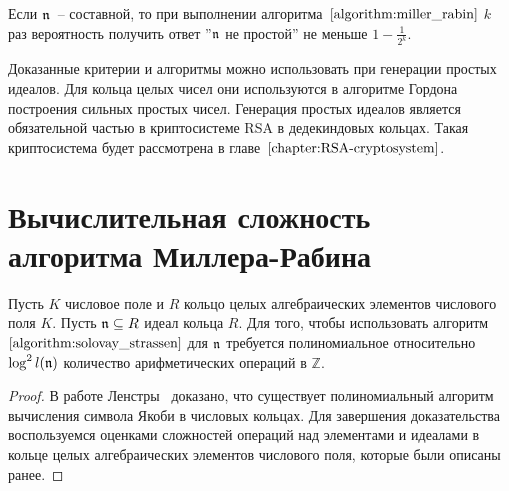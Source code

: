 \documentclass[_00_dissertation.tex]{subfiles}
\begin{document}
\begin{remark}
    Если $\mathfrak{n}$~-- составной, то при выполнении алгоритма~$\ref{algorithm:miller_rabin}$ $k$ раз вероятность получить ответ ''$\mathfrak{n}$ не простой'' не меньше $1 - \frac{1}{2^k}$.
\end{remark}

\begin{remark}
    Доказанные критерии и алгоритмы можно использовать при генерации простых идеалов.
    Для кольца целых чисел они используются в алгоритме Гордона построения сильных простых чисел.
    Генерация простых идеалов является обязательной частью в криптосистеме RSA в дедекиндовых кольцах.
    Такая криптосистема будет рассмотрена в главе~$\ref{chapter:RSA-cryptosystem}$.
\end{remark}

\section{Вычислительная сложность алгоритма Миллера-Рабина}

\begin{proposition}
    Пусть $K$ числовое поле и $R$ кольцо целых алгебраических элементов числового поля $K$.
    Пусть $\mathfrak{n} \subseteq R$ идеал кольца $R$.
    Для того, чтобы использовать алгоритм~$\ref{algorithm:solovay_strassen}$ для $\mathfrak{n}$ требуется полиномиальное относительно $\log^2 l(\mathfrak{n})$ количество арифметических операций в $\mathbb{Z}$.
\end{proposition}
\begin{proof}
    В работе Ленстры~\cite[с.~421]{source:Lenstra_Jacobi} доказано, что существует полиномиальный алгоритм вычисления символа Якоби в числовых кольцах.
    Для завершения доказательства воспользуемся оценками сложностей операций над элементами и идеалами в кольце целых алгебраических элементов числового поля, которые были описаны ранее.
\end{proof}
\end{document}

